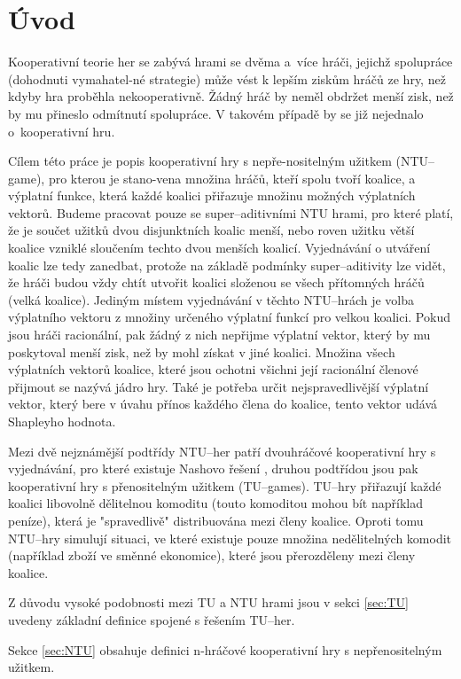 \section{Úvod}
    Kooperativní teorie her se zabývá hrami se dvěma a~více hráči, jejichž spolupráce (dohodnuti vymahatel-né strategie) může vést k lepším ziskům hráčů ze hry, než kdyby hra proběhla nekooperativně. Žádný hráč by neměl obdržet menší zisk, než by mu přineslo odmítnutí spolupráce. V takovém případě by se již nejednalo o~kooperativní hru.

    Cílem této práce je popis kooperativní hry s nepře-nositelným užitkem (NTU--game), pro kterou je stano-vena množina hráčů, kteří spolu tvoří koalice, a výplatní funkce, která každé koalici přiřazuje množinu možných výplatních vektorů. Budeme pracovat pouze se super--aditivními NTU hrami, pro které platí, že je součet užitků dvou disjunktních koalic menší, nebo roven užitku větší koalice vzniklé sloučením techto dvou menších koalicí. Vyjednávání o utváření koalic lze tedy zanedbat, protože na základě podmínky super--aditivity lze vidět, že hráči budou vždy chtít utvořit koalici složenou se všech přítomných hráčů (velká koalice). Jediným místem vyjednávání v těchto NTU--hrách je volba výplatního vektoru z množiny určeného výplatní funkcí pro velkou koalici. Pokud jsou hráči racionální, pak žádný z nich nepřijme výplatní vektor, který by mu poskytoval menší zisk, než by mohl získat v jiné koalici. Množina všech výplatních vektorů koalice, které jsou ochotni všichni její racionální členové přijmout se nazývá jádro hry. Také je potřeba určit nejspravedlivější výplatní vektor, který bere v úvahu přínos každého člena do koalice, tento vektor udává Shapleyho \cite{Shapley1969} hodnota.

    Mezi dvě nejznámější podtřídy NTU--her patří dvouhráčové kooperativní hry s vyjednávání, pro které existuje Nashovo řešení \cite{Nash1950}, druhou podtřídou jsou pak kooperativní hry s přenositelným užitkem (TU--games). TU--hry přiřazují každé koalici libovolně dělitelnou komoditu (touto komoditou mohou bít například peníze), která je "spravedlivě" distribuována mezi členy koalice. Oproti tomu NTU--hry simulují situaci, ve které existuje pouze množina nedělitelných komodit (například zboží ve směnné ekonomice), které jsou přerozděleny mezi členy koalice.

    Z důvodu vysoké podobnosti mezi TU a NTU hrami jsou v sekci \ref{sec:TU} uvedeny základní definice spojené s řešením TU--her.

    Sekce \ref{sec:NTU} obsahuje definici n-hráčové kooperativní hry s nepřenositelným užitkem.

